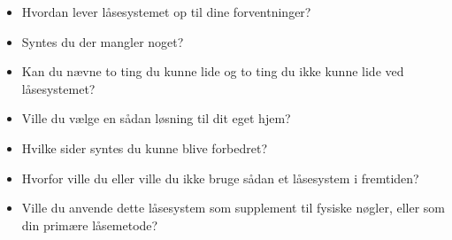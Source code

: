 \documentclass[a4paper,12pt]{article}
\begin{document}
\begin{itemize}
    \item Hvordan lever låsesystemet op til dine forventninger?
    \item Syntes du der mangler noget?
    \item Kan du nævne to ting du kunne lide og to ting du ikke kunne lide ved låsesystemet?
    \item Ville du vælge en sådan løsning til dit eget hjem?
    \item Hvilke sider syntes du kunne blive forbedret?
    \item Hvorfor ville du eller ville du ikke bruge sådan et låsesystem i fremtiden?
    \item Ville du anvende dette låsesystem som supplement til fysiske nøgler, eller som din primære låsemetode?
\end{itemize}
\end{document}
